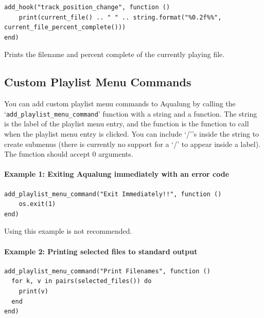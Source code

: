 \documentclass[10pt,english]{article}
\begin{document}
\begin{verbatim}
add_hook("track_position_change", function ()
    print(current_file() .. " " .. string.format("%0.2f%%", current_file_percent_complete()))
end)
\end{verbatim}



\noindent Prints the filename and percent complete of the currently
playing file.






\subsection{Custom Playlist Menu Commands\label{idp2014176}}



\noindent You can add custom playlist menu commands to Aqualung by
calling the `\texttt{add\_playlist\_menu\_command}'
function with a string and a function.  The string is the
label of the playlist menu entry, and the function is the
function to call when the playlist menu entry is clicked.
You can include `/''s inside the string to create
submenus (there is currently no support for a `/' to
appear inside a label).  The function should accept 0
arguments.


\paragraph*{Example 1: Exiting Aqualung immediately with an error code}

\begin{verbatim}
add_playlist_menu_command("Exit Immediately!!", function ()
    os.exit(1)
end)
\end{verbatim}



\noindent Using this example is not recommended.




\paragraph*{Example 2: Printing selected files to standard output}

\begin{verbatim}
add_playlist_menu_command("Print Filenames", function ()
  for k, v in pairs(selected_files()) do
    print(v)
  end
end)
\end{verbatim}
\end{document}

